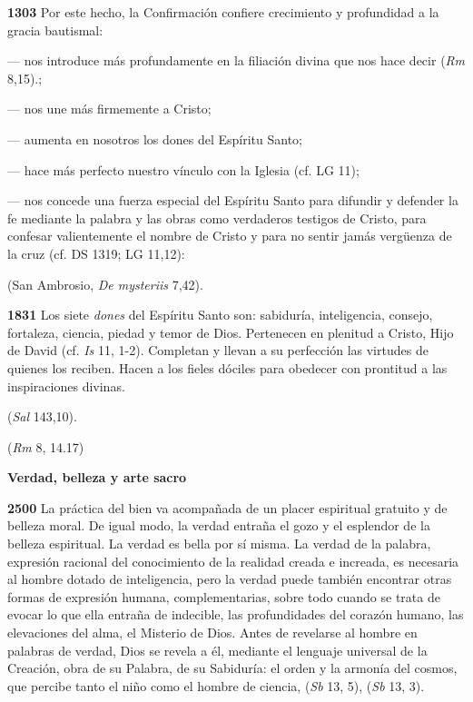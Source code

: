 \begin{body}
\begin{body}
\textbf{1303} Por este hecho, la Confirmación confiere crecimiento y profundidad a la gracia bautismal:

--- nos introduce más profundamente en la filiación divina que nos hace decir  (\emph{Rm} 8,15).;

--- nos une más firmemente a Cristo;

--- aumenta en nosotros los dones del Espíritu Santo;

--- hace más perfecto nuestro vínculo con la Iglesia (cf. LG 11);

--- nos concede una fuerza especial del Espíritu Santo para difundir y defender la fe mediante la palabra y las obras como verdaderos testigos de Cristo, para confesar valientemente el nombre de Cristo y para no sentir jamás vergüenza de la cruz (cf. DS 1319; LG 11,12):

 (San Ambrosio, \emph{De mysteriis} 7,42).

\textbf{1831} Los siete \emph{dones} del Espíritu Santo son: sabiduría, inteligencia, consejo, fortaleza, ciencia, piedad y temor de Dios. Pertenecen en plenitud a Cristo, Hijo de David (cf. \emph{Is} 11, 1-2). Completan y llevan a su perfección las virtudes de quienes los reciben. Hacen a los fieles dóciles para obedecer con prontitud a las inspiraciones divinas.

 (\emph{Sal} 143,10).

 (\emph{Rm} 8, 14.17)

\textbf{Verdad, belleza y arte sacro}

\textbf{2500} La práctica del bien va acompañada de un placer espiritual gratuito y de belleza moral. De igual modo, la verdad entraña el gozo y el esplendor de la belleza espiritual. La verdad es bella por sí misma. La verdad de la palabra, expresión racional del conocimiento de la realidad creada e increada, es necesaria al hombre dotado de inteligencia, pero la verdad puede también encontrar otras formas de expresión humana, complementarias, sobre todo cuando se trata de evocar lo que ella entraña de indecible, las profundidades del corazón humano, las elevaciones del alma, el Misterio de Dios. Antes de revelarse al hombre en palabras de verdad, Dios se revela a él, mediante el lenguaje universal de la Creación, obra de su Palabra, de su Sabiduría: el orden y la armonía del cosmos, que percibe tanto el niño como el hombre de ciencia,  (\emph{Sb} 13, 5),  (\emph{Sb} 13, 3).


\end{body}
\end{body}
